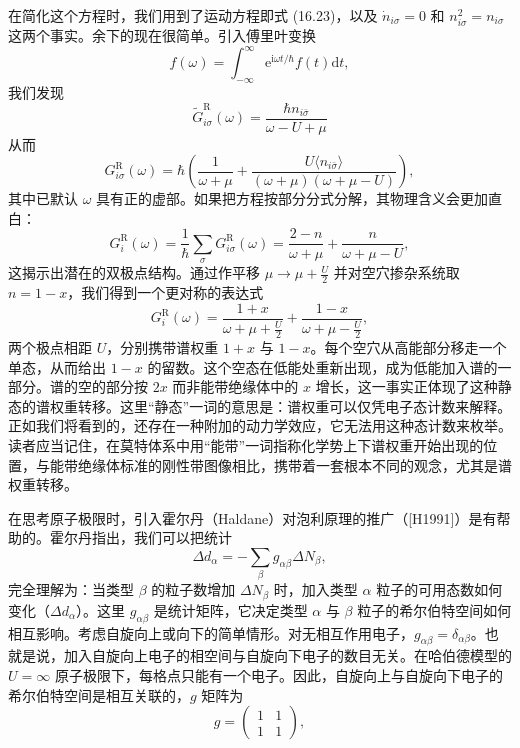 在简化这个方程时，我们用到了运动方程即式 (16.23)，以及 $\dot{n}_{i\sigma}=0$ 和 $n^{2}_{i\sigma}=n_{i\sigma}$ 这两个事实。余下的现在很简单。引入傅里叶变换
\begin{equation*}
f(\omega)=\int_{-\infty}^{\infty}\mathrm{e}^{\mathrm{i}\omega t/\hbar}f(t)\mathrm{d}t,\tag{16.28}
\end{equation*}
我们发现
\begin{equation*}
\tilde{G}^{\mathrm{R}}_{i\sigma}(\omega)=\frac{\hbar n_{i\bar{\sigma}}}{\omega-U+\mu}\tag{16.29}
\end{equation*}
从而
\begin{equation*}
G^{\mathrm{R}}_{i\sigma}(\omega)=\hbar\left(\frac{1}{\omega+\mu}+\frac{U\langle n_{i\bar{\sigma}}\rangle}{(\omega+\mu)(\omega+\mu-U)}\right),\tag{16.30}
\end{equation*}
其中已默认 $\omega$ 具有正的虚部。如果把方程按部分分式分解，其物理含义会更加直白：
\begin{equation*}
G^{\mathrm{R}}_{i}(\omega)=\frac{1}{\hbar}\sum_{\sigma}G^{\mathrm{R}}_{i\sigma}(\omega)=\frac{2-n}{\omega+\mu}+\frac{n}{\omega+\mu-U},\tag{16.31}
\end{equation*}
这揭示出潜在的双极点结构。通过作平移 $\mu\to\mu+\frac{U}{2}$ 并对空穴掺杂系统取 $n=1-x$，我们得到一个更对称的表达式
\begin{equation*}
G^{\mathrm{R}}_{i}(\omega)=\frac{1+x}{\omega+\mu+\frac{U}{2}}+\frac{1-x}{\omega+\mu-\frac{U}{2}},\tag{16.32}
\end{equation*}
两个极点相距 $U$，分别携带谱权重 $1+x$ 与 $1-x$。每个空穴从高能部分移走一个单态，从而给出 $1-x$ 的留数。这个空态在低能处重新出现，成为低能加入谱的一部分。谱的空的部分按 $2x$ 而非能带绝缘体中的 $x$ 增长，这一事实正体现了这种静态的谱权重转移。这里“静态”一词的意思是：谱权重可以仅凭电子态计数来解释。正如我们将看到的，还存在一种附加的动力学效应，它无法用这种态计数来枚举。读者应当记住，在莫特体系中用“能带”一词指称化学势上下谱权重开始出现的位置，与能带绝缘体标准的刚性带图像相比，携带着一套根本不同的观念，尤其是谱权重转移。

在思考原子极限时，引入霍尔丹（Haldane）对泡利原理的推广（[H1991]）是有帮助的。霍尔丹指出，我们可以把统计
\begin{equation*}
\Delta d_{\alpha}=-\sum_{\beta}g_{\alpha\beta}\Delta N_{\beta},\tag{16.33}
\end{equation*}
完全理解为：当类型 $\beta$ 的粒子数增加 $\Delta N_{\beta}$ 时，加入类型 $\alpha$ 粒子的可用态数如何变化（$\Delta d_{\alpha}$）。这里 $g_{\alpha\beta}$ 是统计矩阵，它决定类型 $\alpha$ 与 $\beta$ 粒子的希尔伯特空间如何相互影响。考虑自旋向上或向下的简单情形。对无相互作用电子，$g_{\alpha\beta}=\delta_{\alpha\beta}$。也就是说，加入自旋向上电子的相空间与自旋向下电子的数目无关。在哈伯德模型的 $U=\infty$ 原子极限下，每格点只能有一个电子。因此，自旋向上与自旋向下电子的希尔伯特空间是相互关联的，$g$ 矩阵为
\begin{equation*}
g=\begin{pmatrix}1 & 1\\ 1 & 1\end{pmatrix},\tag{16.34}
\end{equation*}

